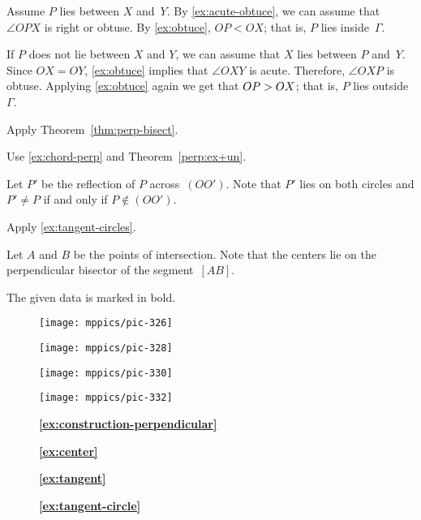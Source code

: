 Assume $P$ lies between $X$ and~$Y$.
By \ref{ex:acute-obtuce}, we can assume that $\angle OPX$ is right or obtuse.
By \ref{ex:obtuce}, $OP<OX$; 
that is, $P$ lies inside~$\Gamma$.

If $P$ does not lie between $X$ and $Y$, we can assume that $X$ lies between $P$ and~$Y$.
Since $OX=OY$, \ref{ex:obtuce} implies that $\angle OXY$ is acute.
Therefore, $\angle OXP$ is obtuse.
Applying \ref{ex:obtuce} again we get that $OP\z>OX$;
that is, $P$ lies outside~$\Gamma$.

 Apply Theorem~\ref{thm:perp-bisect}.

 Use \ref{ex:chord-perp} and Theorem~\ref{perp:ex+un}.

Let $P'$ be the reflection of $P$ across~$(OO')$.
Note that $P'$ lies on both circles and $P'\ne P$ if and only if $P\notin(OO')$.

  Apply \ref{ex:tangent-circles}.

Let $A$ and $B$ be the points of intersection.
Note that the centers lie on the perpendicular bisector of the segment~$[AB]$.

The given data is marked in bold.

\medskip

\begin{figure}[!ht]
\begin{minipage}{.24\textwidth}
\centering
\texttt{[image: mppics/pic-326]}
\end{minipage}
\hfill
\begin{minipage}{.24\textwidth}
\centering
\texttt{[image: mppics/pic-328]}
\end{minipage}
\hfill
\begin{minipage}{.24\textwidth}
\centering
\texttt{[image: mppics/pic-330]}
\end{minipage}
\hfill
\begin{minipage}{.24\textwidth}
\centering
\texttt{[image: mppics/pic-332]}
\end{minipage}

\medskip

\begin{minipage}{.24\textwidth}
\centering
\caption*{\textbf{\ref{ex:construction-perpendicular}}}
\end{minipage}
\hfill
\begin{minipage}{.24\textwidth}
\centering
\caption*{\textbf{\ref{ex:center}}}
\end{minipage}
\hfill
\begin{minipage}{.24\textwidth}
\centering
\caption*{\textbf{\ref{ex:tangent}}}
\end{minipage}
\hfill
\begin{minipage}{.24\textwidth}
\centering
\caption*{\textbf{\ref{ex:tangent-circle}}}
\end{minipage}
\vskip-4mm
\end{figure}

